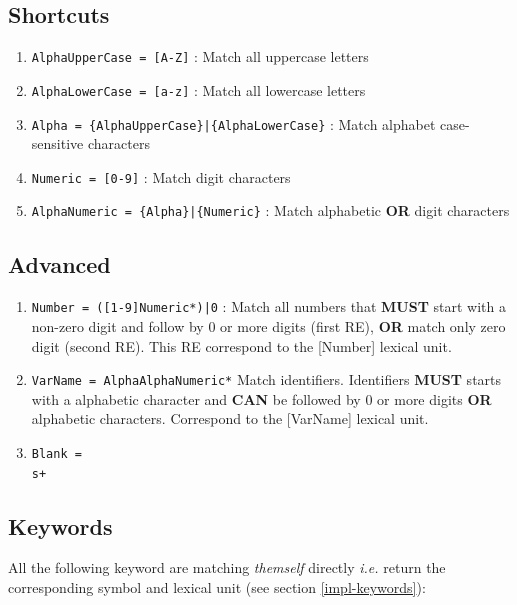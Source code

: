\documentclass[letterpaper]{article}
\begin{document}
\subsection{Shortcuts}

\begin{enumerate}
    \item \texttt{AlphaUpperCase = [A-Z]} : Match all uppercase letters
    \item \texttt{AlphaLowerCase = [a-z]} : Match all lowercase letters
    \item \texttt{Alpha = \{AlphaUpperCase\}|\{AlphaLowerCase\}} :
    Match alphabet case-sensitive characters
    \item \texttt{Numeric = [0-9]} : Match digit characters
    \item \texttt{AlphaNumeric = \{Alpha\}|\{Numeric\}} :
    Match alphabetic \textbf{OR} digit characters
\end{enumerate}

\subsection{Advanced}
\label{advanced-ere}
\begin{enumerate}
    \item \texttt{Number = ([1-9]{Numeric}*)|0} :
    Match all numbers that \textbf{MUST} start with a non-zero digit and follow
    by 0 or more digits (first RE),
    \textbf{OR} match only zero digit (second RE). This RE correspond to
    the [Number] lexical unit.
    \item \texttt{VarName = {Alpha}{AlphaNumeric}*}
    Match identifiers. Identifiers \textbf{MUST} starts with a alphabetic
    character and \textbf{CAN} be followed by 0 or more digits \textbf{OR}
    alphabetic characters.
    Correspond to the [VarName] lexical unit.
    \item \texttt{Blank = \\s+}
\end{enumerate}

\subsection{Keywords}

\label{ere-keywords}

All the following keyword are matching \textit{themself} directly \textit{i.e.}
return the corresponding symbol and lexical unit
(see section \ref{impl-keywords}):\\
\end{document}
